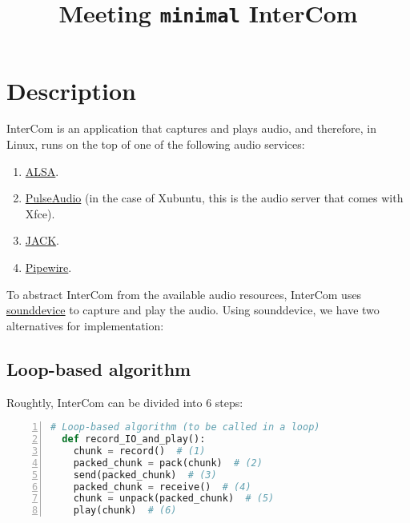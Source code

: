 
\title{Meeting \texttt{minimal} InterCom}

\maketitle

\section{Description}

InterCom is an application that captures and plays audio, and therefore, in Linux, runs on the top of one of the following audio services:
\begin{enumerate}
\item \href{https://vicente-gonzalez-ruiz.github.io/ALSA/}{ALSA}.
\item
  \href{https://vicente-gonzalez-ruiz.github.io/PulseAudio/}{PulseAudio}
  (in the case of Xubuntu, this is the audio server that comes with
  Xfce).
\item \href{https://vicente-gonzalez-ruiz.github.io/JACK/}{JACK}.
\item \href{https://pipewire.org/}{Pipewire}.
\end{enumerate}

To abstract InterCom from the available audio resources, InterCom uses
\href{https://vicente-gonzalez-ruiz.github.io/intro_to_sounddevice/}{sounddevice}
to capture and play the audio. Using sounddevice, we have two
alternatives for implementation:

\subsection{Loop-based algorithm}

Roughtly, InterCom can be divided into 6 steps:

\begin{lstlisting}[language=Python,numbers=left]
  # Loop-based algorithm (to be called in a loop)
  def record_IO_and_play():
    chunk = record()  # (1)
    packed_chunk = pack(chunk)  # (2)
    send(packed_chunk)  # (3)
    packed_chunk = receive()  # (4)
    chunk = unpack(packed_chunk)  # (5)
    play(chunk)  # (6)
\end{lstlisting}


